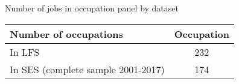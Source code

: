 \begin{center}
\begin{threeparttable}[!h]
\caption{Number of jobs in occupation panel by dataset}
\label{tab:sesOccCount}
\begin{tabular}{lc}
\toprule
\toprule
\textbf{Number of occupations}&\multicolumn{1}{c}{\textbf{Occupation}} \\
\midrule
In LFS & 232 \\
In SES (complete sample 2001-2017) & 174 \\
\bottomrule
\bottomrule
\end{tabular}
\end{threeparttable}
\end{center}
